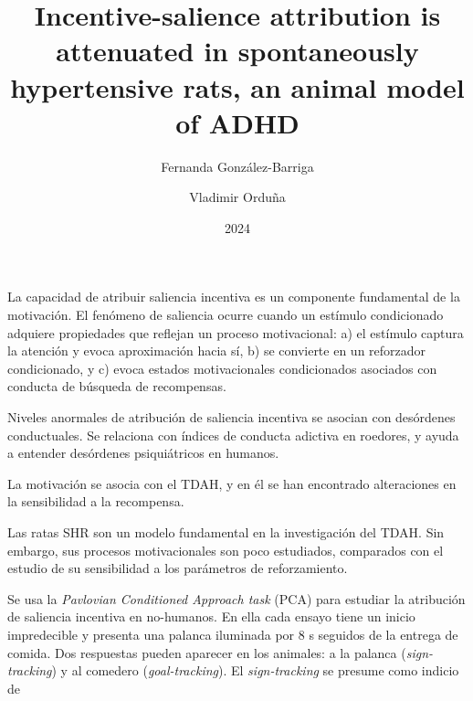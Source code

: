 \documentclass[a4paper,12pt]{article}
\title{Incentive-salience attribution is attenuated in spontaneously hypertensive rats, an animal model of ADHD}
\author{Fernanda González-Barriga \and Vladimir Orduña}
\date{2024}
\begin{document}
{\scshape\bfseries \maketitle}

La capacidad de atribuir saliencia incentiva es un componente fundamental de la motivación.
El fenómeno de saliencia ocurre cuando un estímulo condicionado adquiere propiedades que reflejan un proceso motivacional: a) el estímulo captura la atención y evoca aproximación hacia sí, b) se convierte en un reforzador condicionado, y c) evoca estados motivacionales condicionados asociados con conducta de búsqueda de recompensas.

Niveles anormales de atribución de saliencia incentiva se asocian con desórdenes conductuales.
Se relaciona con índices de conducta adictiva en roedores, y ayuda a entender desórdenes psiquiátricos en humanos.

La motivación se asocia con el TDAH, y en él se han encontrado alteraciones en la sensibilidad a la recompensa.

Las ratas SHR son un modelo fundamental en la investigación del TDAH.
Sin embargo, sus procesos motivacionales son poco estudiados, comparados con el estudio de su sensibilidad a los parámetros de reforzamiento.

Se usa la {\itshape Pavlovian Conditioned Approach task} (PCA) para estudiar la atribución de saliencia incentiva en no-humanos.
En ella cada ensayo tiene un inicio impredecible y presenta una palanca iluminada por 8 s seguidos de la entrega de comida.
Dos respuestas pueden aparecer en los animales: a la palanca ({\itshape sign-tracking}) y al comedero ({\itshape goal-tracking}).
El {\itshape sign-tracking} se presume como indicio de 
\end{document}
